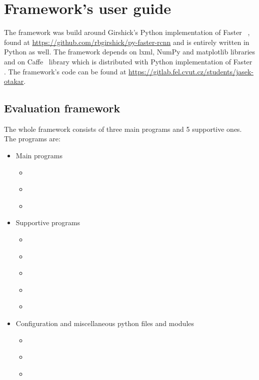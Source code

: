 \chapter{Framework's user guide}

The framework was build around Girshick's Python implementation of Faster \rcnn~\cite{faster}, found at \url{https://github.com/rbgirshick/py-faster-rcnn} and is entirely written in Python as well. The framework depends on lxml, NumPy and matplotlib libraries and on Caffe~\cite{caffe} library which is distributed with Python implementation of Faster \rcnn{}. The framework's code can be found at \url{https://gitlab.fel.cvut.cz/students/jasek-otakar}.

\section{Evaluation framework}
The whole framework consists of three main programs and 5 supportive ones. The programs are:
\begin{itemize}
\item Main programs
\begin{itemize}
\item \hyperref[rec]{}
\item \hyperref[pr]{}
\item \hyperref[tr]{}
\end{itemize}
\item Supportive programs
\begin{itemize}
\item \hyperref[ftf]{}
\item \hyperref[bbox]{}
\item \hyperref[xtk]{}
\item \hyperref[ktx]{}
\item \hyperref[tme]{}
\end{itemize}
\item Configuration and miscellaneous python files and modules
\begin{itemize}
\item \hyperref[xml]{}
\item \hyperref[init]{}
\item \hyperref[parse]{}
\end{itemize}
\end{itemize}

